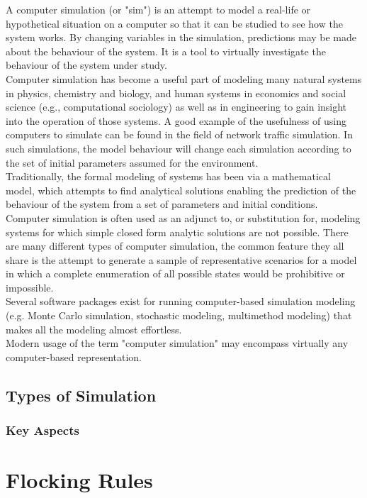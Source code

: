 \documentclass[12pt]{report}
\begin{document}
A computer simulation (or "sim") is an attempt to model a real-life or hypothetical situation on a computer so that it can be studied to see how the system works. By changing variables in the simulation, predictions may be made about the behaviour of the system. It is a tool to virtually investigate the behaviour of the system under study.
\\
Computer simulation has become a useful part of modeling many natural systems in physics, chemistry and biology, and human systems in economics and social science (e.g., computational sociology) as well as in engineering to gain insight into the operation of those systems. A good example of the usefulness of using computers to simulate can be found in the field of network traffic simulation. In such simulations, the model behaviour will change each simulation according to the set of initial parameters assumed for the environment.
\\
Traditionally, the formal modeling of systems has been via a mathematical model, which attempts to find analytical solutions enabling the prediction of the behaviour of the system from a set of parameters and initial conditions. Computer simulation is often used as an adjunct to, or substitution for, modeling systems for which simple closed form analytic solutions are not possible. There are many different types of computer simulation, the common feature they all share is the attempt to generate a sample of representative scenarios for a model in which a complete enumeration of all possible states would be prohibitive or impossible.
\\
Several software packages exist for running computer-based simulation modeling (e.g. Monte Carlo simulation, stochastic modeling, multimethod modeling) that makes all the modeling almost effortless.
\\
Modern usage of the term "computer simulation" may encompass virtually any computer-based representation.

\section{Types of Simulation}
\subsection{Key Aspects}

\chapter{Flocking Rules}
\end{document}
